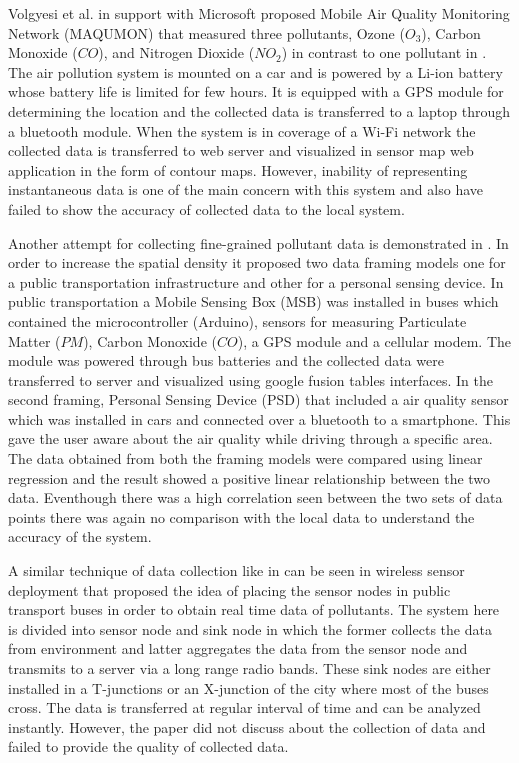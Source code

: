  Volgyesi et al. \cite{Volgyesi2008} in support with Microsoft proposed Mobile Air Quality Monitoring Network (MAQUMON) that measured three pollutants, Ozone ($O_3$), Carbon Monoxide ($CO$), and Nitrogen Dioxide ($NO_2$) in contrast to one pollutant in \cite{Hu2011}. The air pollution system is mounted on a car and is powered by a Li-ion battery whose battery life is limited for few hours. It is equipped with a GPS module for determining the location and the collected data is transferred to a laptop through a bluetooth module. When the system is in coverage of a Wi-Fi network the collected data is transferred to web server and visualized in sensor map web application in the form of contour maps. However, inability of representing instantaneous data is one of the main concern with this system and also  have failed to show the accuracy of collected data to the local system.


\par

Another attempt for collecting fine-grained pollutant data is demonstrated in \cite{Devarakonda2013}. In order to increase the spatial density it proposed two data framing models one for a public transportation infrastructure and other for a personal sensing device. In public transportation a Mobile Sensing Box (MSB) was installed in buses which contained the microcontroller (Arduino), sensors for measuring Particulate Matter ($PM$), Carbon Monoxide ($CO$), a GPS module and a cellular modem. The module was powered through bus batteries and the collected data were transferred to server and visualized using google fusion tables interfaces. In the second framing, Personal Sensing Device (PSD) that included a air quality sensor which was installed in cars and connected over a bluetooth to a smartphone. This gave the user aware about the air quality while driving through a specific area.
The data obtained from both the framing models were compared using linear regression and the result showed a positive linear relationship between the two data. Eventhough there was a high correlation seen between the two sets of data points there was again no comparison with the local data to understand the accuracy of the system.

\par

A similar technique of data collection like in \cite{Devarakonda2013} can be seen in wireless sensor deployment \cite{Saha2017} that proposed the idea of placing the sensor nodes in public transport buses in order to obtain real time data of pollutants. The system here is divided into sensor node and sink node in which the former collects the data from environment and latter aggregates the data from the sensor node and transmits to a server via a long range radio bands. These sink nodes are either installed in a T-junctions or an X-junction of the city where most of the buses cross. The data is transferred at regular interval of time and can be analyzed instantly. However, the paper did not discuss about the collection of data and failed to provide the quality of collected data.



